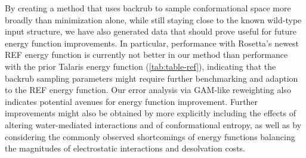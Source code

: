 By creating a method that uses backrub to sample conformational space more broadly than minimization alone, while still staying close to the known wild-type input structure, we have also generated data that should prove useful for future energy function improvements.
In particular, performance with Rosetta's newest REF energy function\cite{alford_rosetta_2017} is currently not better in our method than performance with the prior Talaris\cite{leaver-fay_chapter_2013,song_structure-guided_2011,shapovalov_smoothed_2011} energy function (\cref{tab:table-ref}), indicating that the backrub sampling parameters might require further benchmarking and adaption to the REF energy function.
Our error analysis via GAM-like reweighting also indicates potential avenues for energy function improvement.
Further improvements might also be obtained by more explicitly including the effects of altering water-mediated interactions\cite{lai_enhancing_2017} and of conformational entropy\cite{hu_protein_2006,guerois_predicting_2002}, as well as by considering the commonly observed shortcomings of energy functions balancing the magnitudes of electrostatic interactions and desolvation costs.



